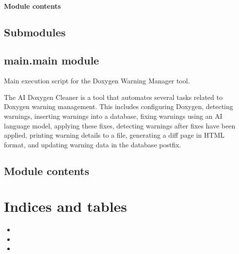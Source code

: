 \documentclass[letterpaper,10pt,english]{sphinxmanual}
\begin{document}
\subsubsection{Module contents}
\label{\detokenize{main.utils:module-main.utils}}\label{\detokenize{main.utils:module-contents}}

\section{Submodules}
\label{\detokenize{main:submodules}}

\section{main.main module}
\label{\detokenize{main:module-main.main}}\label{\detokenize{main:main-main-module}}
\sphinxAtStartPar
Main execution script for the Doxygen Warning Manager tool.

\sphinxAtStartPar
The AI Doxygen Cleaner is a tool that automates several tasks related to Doxygen warning management. This includes
configuring Doxygen, detecting warnings, inserting warnings into a database, fixing warnings using an AI language
model, applying these fixes, detecting warnings after fixes have been applied, printing warning details to a file,
generating a diff page in HTML format, and updating warning data in the database post\sphinxhyphen{}fix.


\section{Module contents}
\label{\detokenize{main:module-main}}\label{\detokenize{main:module-contents}}

\chapter{Indices and tables}
\label{\detokenize{index:indices-and-tables}}\begin{itemize}
\item {} 
\sphinxAtStartPar
{}

\item {} 
\sphinxAtStartPar
{}

\item {} 
\sphinxAtStartPar
{}

\end{itemize}
\end{document}
